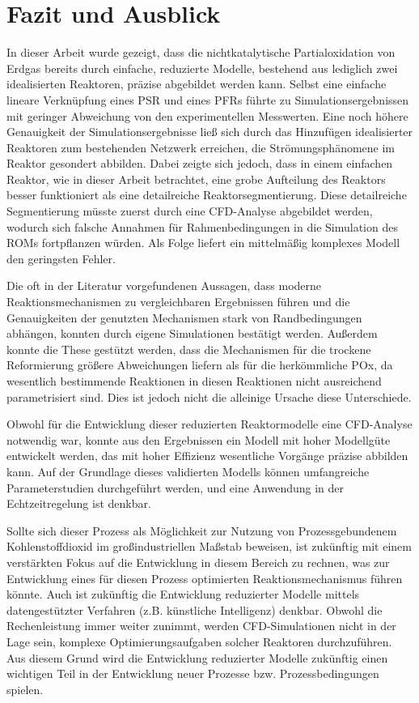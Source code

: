 \chapter{Fazit und Ausblick}

    In dieser Arbeit wurde gezeigt, dass die nichtkatalytische Partialoxidation von Erdgas bereits durch einfache, reduzierte Modelle, bestehend aus lediglich zwei idealisierten Reaktoren, präzise abgebildet werden kann. Selbst eine einfache lineare Verknüpfung eines PSR und eines PFRs führte zu Simulationsergebnissen mit geringer Abweichung von den experimentellen Messwerten. 
    Eine noch höhere Genauigkeit der Simulationsergebnisse ließ sich durch das Hinzufügen idealisierter Reaktoren zum bestehenden Netzwerk erreichen, die Strömungsphänomene im Reaktor gesondert abbilden. Dabei zeigte sich jedoch, dass in einem einfachen Reaktor, wie in dieser Arbeit betrachtet, eine grobe Aufteilung des Reaktors besser funktioniert als eine detailreiche Reaktorsegmentierung. Diese detailreiche Segmentierung müsste zuerst durch eine CFD-Analyse abgebildet werden, wodurch sich falsche Annahmen für Rahmenbedingungen in die Simulation des ROMs fortpflanzen würden. Als Folge liefert ein mittelmäßig komplexes Modell den geringsten Fehler. 

    Die oft in der Literatur vorgefundenen Aussagen, dass moderne Reaktionsmechanismen zu vergleichbaren Ergebnissen führen und die Genauigkeiten der genutzten Mechanismen stark von Randbedingungen abhängen, konnten durch eigene Simulationen bestätigt werden. Außerdem konnte die These gestützt werden, dass die Mechanismen für die trockene Reformierung größere Abweichungen liefern als für die herkömmliche POx, da wesentlich bestimmende Reaktionen in diesen Reaktionen nicht ausreichend parametrisiert sind. Dies ist jedoch nicht die alleinige Ursache diese Unterschiede.

    Obwohl für die Entwicklung dieser reduzierten Reaktormodelle eine CFD-Analyse notwendig war, konnte aus den Ergebnissen ein Modell mit hoher Modellgüte entwickelt werden, das mit hoher Effizienz wesentliche Vorgänge präzise abbilden kann. Auf der Grundlage dieses validierten Modells können umfangreiche Parameterstudien durchgeführt werden, und eine Anwendung in der Echtzeitregelung ist denkbar.

    Sollte sich dieser Prozess als Möglichkeit zur Nutzung von Prozessgebundenem Kohlenstoffdioxid im großindustriellen Maßstab beweisen, ist zukünftig mit einem verstärkten Fokus auf die Entwicklung in diesem Bereich zu rechnen, was zur Entwicklung eines für diesen Prozess optimierten Reaktionsmechanismus führen könnte. Auch ist zukünftig die Entwicklung reduzierter Modelle mittels datengestützter Verfahren (z.B. künstliche Intelligenz) denkbar. Obwohl die Rechenleistung immer weiter zunimmt, werden CFD-Simulationen nicht in der Lage sein, komplexe Optimierungsaufgaben solcher Reaktoren durchzuführen. Aus diesem Grund wird die Entwicklung reduzierter Modelle zukünftig einen wichtigen Teil in der Entwicklung neuer Prozesse bzw. Prozessbedingungen spielen. 